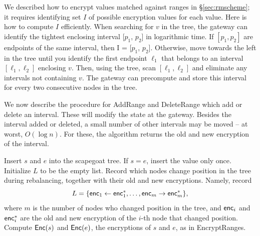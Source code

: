 \eat{
}
We described how to encrypt values matched against ranges in \S\ref{sec:rmscheme}; it requires identifying set $I$ of possible encryption values for each value.
Here is how to compute $I$ efficiently. When searching for $v$ in the tree, the gateway
can identify the tightest enclosing interval [$p_1$, $p_2$] in logarithmic time. 
 If $[p_1, p_2]$ are endpoints of the
same interval, then I = [$p_1$, $p_2$]. Otherwise, move towards the left in the tree until you identify the first endpoint
$\ell_1$
that belongs to an interval $[\ell_1, \ell_2]$ enclosing $v$. Then, using the tree, scan $[\ell_1, \ell_2]$ and eliminate
any intervals not containing $v$. The gateway can precompute and store this interval for every two consecutive nodes in the tree.

We now describe the procedure for AddRange and DeleteRange which add or delete an interval. 
These will modify the state at the gateway. Besides the interval added or deleted, a small number
of other intervals may be moved -- at worst, $O(\log n)$. For these, the algorithm returns the old and new encryption of the interval. 


\begin{framed}
\begin{algorithmic}[1]

  \State Insert $s$ and $e$ into the scapegoat tree. If $s=e$, insert the value only once.
  \State Initialize $L$ to be the empty list.
  	\State Record which nodes change position in the tree during rebalancing, together with 
	their old and new encryptions. Namely, record	\[L = \{ \mathsf{enc}_1 \leftarrow \mathsf{enc}^*_1, \dots, \mathsf{enc}_m \rightarrow \mathsf{enc}^*_m\},\] where $m$ is the number of nodes who changed position in the tree, and $\mathsf{enc}_i$ and $\mathsf{enc}^*_i$ are the old and new encryption of the $i$-th node that changed position. 
  \EndIf
  \State Compute  $\mathsf{Enc}(s)$ and $\mathsf{Enc}(e)$, the encryptions of $s$ and $e$, as in EncryptRanges.
   \State {}
\EndProcedure

\end{algorithmic}
\end{framed}

